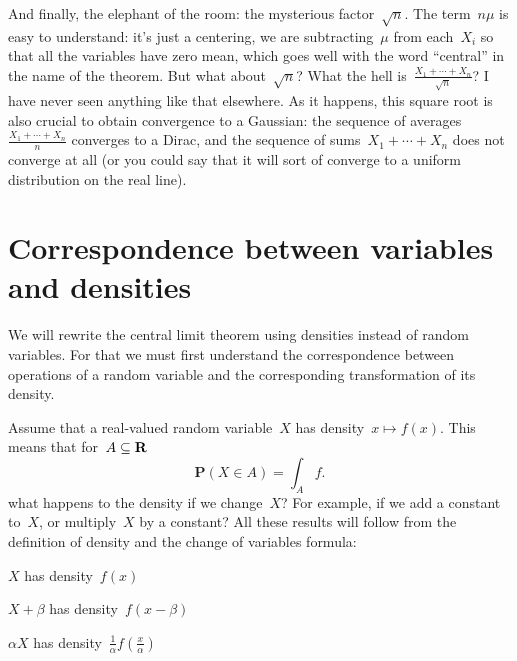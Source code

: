 And finally, the elephant of the room:  the mysterious
factor~$\sqrt{n}$.  The term~$n\mu$ is easy to understand: it's just
a centering, we are subtracting~$\mu$ from each~$X_i$ so that all the
variables have zero mean, which goes well with the word ``central''
in the name of the theorem.  But what about~$\sqrt{n}$?  What the
hell is~$\frac{X_1+\cdots+X_n}{\sqrt{n}}$?  I have never seen
anything like that elsewhere.  As it happens, this square root is
also crucial to obtain convergence to a Gaussian: the sequence of
averages~$\frac{X_1+\cdots+X_n}n$ converges to a Dirac, and the
sequence of sums~$X_1+\cdots+X_n$ does not converge at all (or you
could say that it will sort of converge to a uniform distribution on
the real line).

%

\section{Correspondence between variables and densities}

We will rewrite the central limit theorem using densities instead of
random variables.  For that we must first understand the
correspondence between operations of a random variable and the
corresponding transformation of its density.

Assume that a real-valued random variable~$X$ has density~$x\mapsto
f(x)$.  This means that for~$A\subseteq\mathbf{R}$
\[
	\mathbf{P}(X\in A)=\int_Af.
\]
what happens to the density if we change~$X$?  For example, if we add
a constant to~$X$, or multiply~$X$ by a constant?  All these results
will follow from the definition of density and the change of
variables formula:

$X$ has density~$f(x)$

$X+\beta$ has density~$f\left(x-\beta\right)$

$\alpha X$ has density~$\frac1{\alpha}f\left(\frac{x}{\alpha}\right)$

